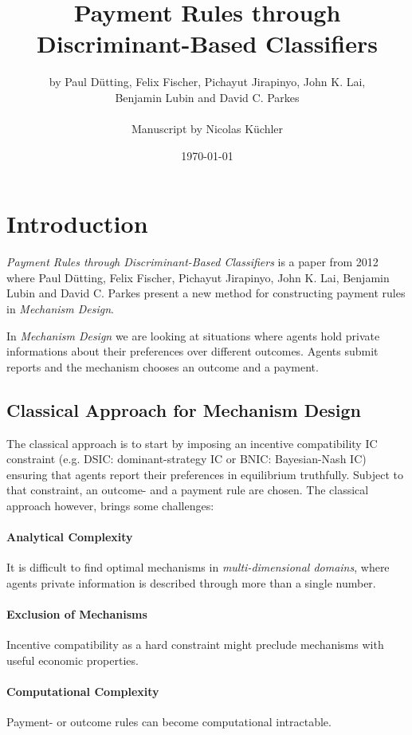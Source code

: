\documentclass[]{article}
\title{Payment Rules through \\ Discriminant-Based Classifiers}
\author{ by Paul D\"utting, Felix Fischer, Pichayut Jirapinyo, John K. Lai, \\Benjamin Lubin and David C. Parkes \\ \\ Manuscript by Nicolas K\"uchler}
\date{\today}
\begin{document}
\maketitle

\section{Introduction}
\emph{Payment Rules through Discriminant-Based Classifiers} is a paper from 2012 where Paul D\"utting, Felix Fischer, Pichayut Jirapinyo, John K. Lai, Benjamin Lubin and David C. Parkes present a new method for constructing payment rules in \emph{Mechanism Design}.

\noindent In \emph{Mechanism Design} we are looking at situations where agents hold private informations about their preferences over different outcomes. 
Agents submit reports and the mechanism chooses an outcome and a payment.


\subsection{Classical Approach for Mechanism Design}
The classical approach is to start by imposing an incentive compatibility IC constraint (e.g. DSIC: dominant-strategy IC or BNIC: Bayesian-Nash IC) ensuring that agents report their preferences in equilibrium truthfully. Subject to that constraint, an outcome- and a payment rule are chosen. The classical approach however, brings some challenges:


\paragraph{Analytical Complexity} It is difficult to find optimal mechanisms in \emph{multi-dimensional domains}, where agents private information is described through more than a single number.

\paragraph{Exclusion of Mechanisms} Incentive compatibility as a hard constraint might preclude mechanisms with useful economic properties.

\paragraph{Computational Complexity} Payment- or outcome rules can become computational intractable.
\end{document}
